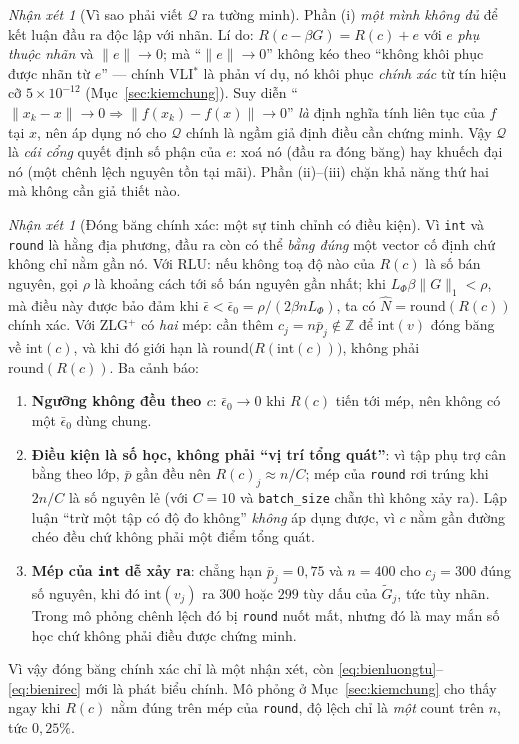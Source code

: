 \documentclass[11pt]{article}
\theoremstyle{remark}
\newtheorem{nhanxet}[dinhly]{Nhận xét}
\begin{document}
\begin{nhanxet}[Vì sao phải viết $\mathcal{Q}$ ra tường minh]
\label{nx:vaitroQ}
Phần (i) \emph{một mình không đủ} để kết luận đầu ra độc lập với nhãn.
Lí do: $R(c-\beta G) = R(c) + e$ với $e$ \emph{phụ thuộc nhãn} và
$\|e\|\to0$; mà ``$\|e\|\to0$'' không kéo theo ``không khôi phục được nhãn
từ $e$'' --- chính VLI$^*$ là phản ví dụ, nó khôi phục \emph{chính xác} từ
tín hiệu cỡ $5\times10^{-12}$ (Mục~\ref{sec:kiemchung}). Suy diễn
``$\|x_k - x\| \to 0 \Rightarrow \|f(x_k)-f(x)\| \to 0$'' \emph{là} định
nghĩa tính liên tục của $f$ tại $x$, nên áp dụng nó cho $\mathcal{Q}$ chính
là ngầm giả định điều cần chứng minh. Vậy $\mathcal{Q}$ là \emph{cái cổng}
quyết định số phận của $e$: xoá nó (đầu ra đóng băng) hay khuếch đại nó
(một chênh lệch nguyên tồn tại mãi). Phần (ii)--(iii) chặn khả năng thứ hai
mà không cần giả thiết nào.
\end{nhanxet}

\begin{nhanxet}[Đóng băng chính xác: một sự tinh chỉnh có điều kiện]
\label{nx:dongbang}
Vì \texttt{int} và \texttt{round} là hằng địa phương, đầu ra còn có thể
\emph{bằng đúng} một vector cố định chứ không chỉ nằm gần nó. Với RLU: nếu
không toạ độ nào của $R(c)$ là số bán nguyên, gọi $\rho$ là khoảng cách tới
số bán nguyên gần nhất; khi $L_\Phi\beta\|G\|_1 < \rho$, mà điều này được
bảo đảm khi $\bar\epsilon < \bar\epsilon_0 = \rho/(2\beta nL_\Phi)$, ta có
$\widehat N = \mathrm{round}(R(c))$ chính xác. Với ZLG$^+$ có \emph{hai}
mép: cần thêm $c_j = n\bar p_j \notin \mathbb Z$ để $\mathrm{int}(v)$ đóng
băng về $\mathrm{int}(c)$, và khi đó giới hạn là
$\mathrm{round}\bigl(R(\mathrm{int}(c))\bigr)$, không phải
$\mathrm{round}(R(c))$. Ba cảnh báo:
\begin{enumerate}
\item \textbf{Ngưỡng không đều theo $c$}: $\bar\epsilon_0 \to 0$ khi
 $R(c)$ tiến tới mép, nên không có một $\bar\epsilon_0$ dùng chung.
\item \textbf{Điều kiện là số học, không phải ``vị trí tổng quát''}: vì tập
 phụ trợ cân bằng theo lớp, $\bar p$ gần đều nên $R(c)_j \approx n/C$; mép
 của \texttt{round} rơi trúng khi $2n/C$ là số nguyên lẻ (với $C=10$ và
 \texttt{batch\_size} chẵn thì không xảy ra). Lập luận ``trừ một tập có độ
 đo không'' \emph{không} áp dụng được, vì $c$ nằm gần đường chéo đều chứ
 không phải một điểm tổng quát.
\item \textbf{Mép của \texttt{int} dễ xảy ra}: chẳng hạn $\bar p_j = 0{,}75$
 và $n = 400$ cho $c_j = 300$ đúng số nguyên, khi đó $\mathrm{int}(v_j)$ ra
 $300$ hoặc $299$ tùy dấu của $\tilde G_j$, tức tùy nhãn. Trong mô phỏng
 chênh lệch đó bị \texttt{round} nuốt mất, nhưng đó là may mắn số học chứ
 không phải điều được chứng minh.
\end{enumerate}
Vì vậy đóng băng chính xác chỉ là một nhận xét, còn
\eqref{eq:bienluongtu}--\eqref{eq:bienirec} mới là phát biểu chính. Mô phỏng
ở Mục~\ref{sec:kiemchung} cho thấy ngay khi $R(c)$ nằm đúng trên mép của
\texttt{round}, độ lệch chỉ là \emph{một} count trên $n$, tức $0{,}25\%$.
\end{nhanxet}
\end{document}
